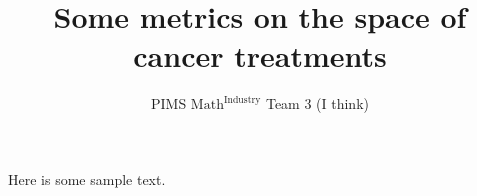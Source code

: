 \documentclass[titlepage, hidelinks, 12pt]{article}
\theoremstyle{plain}
\theoremstyle{remark}
\theoremstyle{definition}
\begin{document}
\title{Some metrics on the space of cancer treatments}
\author{PIMS $\text{Math}^{\text{Industry}}$ Team 3 (I think)}
\maketitle






\newpage


Here is some sample text.
\end{document}
